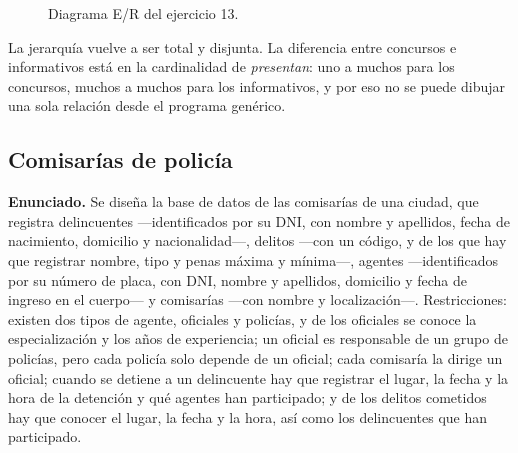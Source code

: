 \begin{figure}[H]
\centering
{}
\caption{Diagrama E/R del ejercicio 13.}
\end{figure}

La jerarquía vuelve a ser total y disjunta. La diferencia entre concursos e
informativos está en la cardinalidad de \emph{presentan}: uno a muchos para los
concursos, muchos a muchos para los informativos, y por eso no se puede
dibujar una sola relación desde el programa genérico.

\subsection{Comisarías de policía}

\textbf{Enunciado.} Se diseña la base de datos de las comisarías de una ciudad,
que registra delincuentes —identificados por su DNI, con nombre y apellidos,
fecha de nacimiento, domicilio y nacionalidad—, delitos —con un código, y de los
que hay que registrar nombre, tipo y penas máxima y mínima—, agentes
—identificados por su número de placa, con DNI, nombre y apellidos, domicilio y
fecha de ingreso en el cuerpo— y comisarías —con nombre y localización—.
Restricciones: existen dos tipos de agente, oficiales y policías, y de los
oficiales se conoce la especialización y los años de experiencia; un oficial es
responsable de un grupo de policías, pero cada policía solo depende de un
oficial; cada comisaría la dirige un oficial; cuando se detiene a un delincuente
hay que registrar el lugar, la fecha y la hora de la detención y qué agentes han
participado; y de los delitos cometidos hay que conocer el lugar, la fecha y la
hora, así como los delincuentes que han participado.

